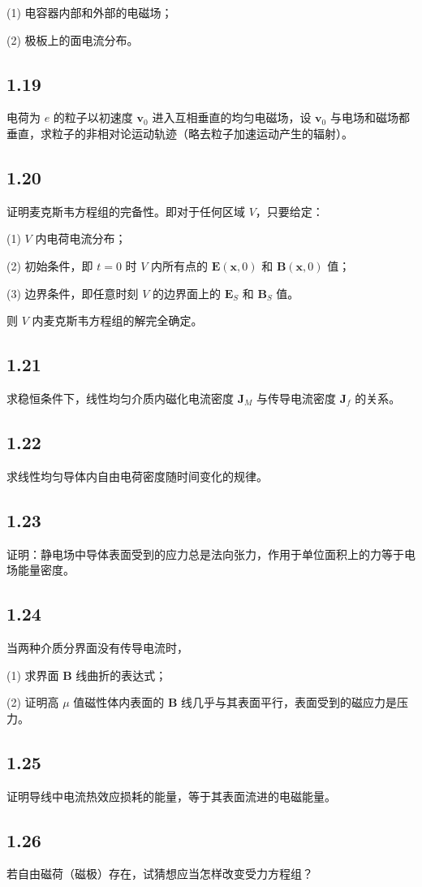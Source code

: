 (1) 电容器内部和外部的电磁场；

(2) 极板上的面电流分布。

\newpage
\subsection{1.19}
电荷为 $e$ 的粒子以初速度 $\boldsymbol{v}_0$ 进入互相垂直的均匀电磁场，设 $\boldsymbol{v}_0$ 与电场和磁场都垂直，求粒子的非相对论运动轨迹（略去粒子加速运动产生的辐射）。

\newpage
\subsection{1.20}
证明麦克斯韦方程组的完备性。即对于任何区域 $V$，只要给定：

(1) $V$ 内电荷电流分布；

(2) 初始条件，即 $t = 0$ 时 $V$ 内所有点的 $\boldsymbol{E}(\boldsymbol{x}, 0)$ 和 $\boldsymbol{B}(\boldsymbol{x}, 0)$ 值；

(3) 边界条件，即任意时刻 $V$ 的边界面上的 $\boldsymbol{E}_S$ 和 $\boldsymbol{B}_S$ 值。

则 $V$ 内麦克斯韦方程组的解完全确定。

\newpage
\subsection{1.21}
求稳恒条件下，线性均匀介质内磁化电流密度 $\boldsymbol{J}_M$ 与传导电流密度 $\boldsymbol{J}_f$ 的关系。

\newpage
\subsection{1.22}
求线性均匀导体内自由电荷密度随时间变化的规律。

\newpage
\subsection{1.23}
证明：静电场中导体表面受到的应力总是法向张力，作用于单位面积上的力等于电场能量密度。

\newpage
\subsection{1.24}
当两种介质分界面没有传导电流时，

(1) 求界面 $\boldsymbol{B}$ 线曲折的表达式；

(2) 证明高 $\mu$ 值磁性体内表面的 $\boldsymbol{B}$ 线几乎与其表面平行，表面受到的磁应力是压力。

\newpage
\subsection{1.25}
证明导线中电流热效应损耗的能量，等于其表面流进的电磁能量。

\newpage
\subsection{1.26}
若自由磁荷（磁极）存在，试猜想应当怎样改变受力方程组？